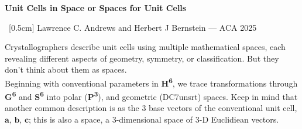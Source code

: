 \documentclass[12pt]{article}
\newcommand{\HVI}{\textbf{H\textsuperscript{6}}}
\newcommand{\GVI}{\textbf{G\textsuperscript{6}}}
\newcommand{\SVI}{\textbf{S\textsuperscript{6}}}
\newcommand{\PVI}{\textbf{P\textsuperscript{3}}}
\newcommand{\va}{\ensuremath{\mathbf{a}}}
\newcommand{\vb}{\ensuremath{\mathbf{b}}}
\newcommand{\vc}{\ensuremath{\mathbf{c}}}
\begin{document}
	
	\begin{center}
		{\fontsize{90}{100}\selectfont\textbf{Unit Cells in Space or Spaces for Unit Cells}}\
		
		
		
		\ [0.5cm]
		{\fontsize{60}{60}\selectfont Lawrence C. Andrews and Herbert J Bernstein — ACA 2025}
	\end{center}
	
	\vspace{0.8cm}
	
	\noindent
	\parbox[t]{0.48\textwidth}{
		\tcolorbox[title=Crystallographic Space Map]
		\begin{center}
		\end{center}
		\endtcolorbox
	}
	\hfill
	\parbox[t]{0.48\textwidth}{
		\tcolorbox[title=Abstract]
		Crystallographers describe unit cells using multiple mathematical spaces, each revealing different aspects of geometry, symmetry, or classification. But they don't think about them as spaces. \\ Beginning with conventional parameters in \HVI{}, we trace transformations through \GVI{} and \SVI{} into polar (\PVI{}), and geometric (DC7unsrt) spaces. Keep in mind
		that another common description is as the 3 base vectors
		of the conventional unit cell, \va, \vb, \vc; this is 
		also a space, a 3-dimensional space of 3-D Euclidiean  vectors.
		\endtcolorbox
	}
	
	\vspace{1cm}
	
\end{document}
